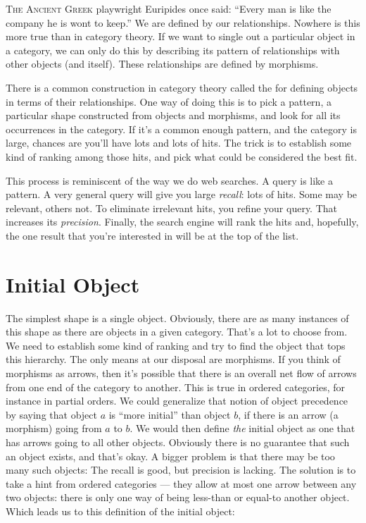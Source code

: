 \lettrine[lhang=0.17]{T}{he Ancient Greek} playwright Euripides once said: ``Every man is like
the company he is wont to keep.'' We are defined by our relationships.
Nowhere is this more true than in category theory. If we want to single
out a particular object in a category, we can only do this by describing
its pattern of relationships with other objects (and itself). These
relationships are defined by morphisms.

There is a common construction in category theory called the
 for defining objects in terms of their
relationships. One way of doing this is to pick a pattern, a particular
shape constructed from objects and morphisms, and look for all its
occurrences in the category. If it's a common enough pattern, and the
category is large, chances are you'll have lots and lots of hits. The
trick is to establish some kind of ranking among those hits, and pick
what could be considered the best fit.

This process is reminiscent of the way we do web searches. A query is
like a pattern. A very general query will give you large \emph{recall}:
lots of hits. Some may be relevant, others not. To eliminate irrelevant
hits, you refine your query. That increases its \emph{precision}.
Finally, the search engine will rank the hits and, hopefully, the one
result that you're interested in will be at the top of the list.

\section{Initial Object}

The simplest shape is a single object. Obviously, there are as many
instances of this shape as there are objects in a given category. That's
a lot to choose from. We need to establish some kind of ranking and try
to find the object that tops this hierarchy. The only means at our
disposal are morphisms. If you think of morphisms as arrows, then it's
possible that there is an overall net flow of arrows from one end of the
category to another. This is true in ordered categories, for instance in
partial orders. We could generalize that notion of object precedence by
saying that object $a$ is ``more initial'' than object $b$, if
there is an arrow (a morphism) going from $a$ to $b$. We would
then define \emph{the} initial object as one that has arrows going to
all other objects. Obviously there is no guarantee that such an object
exists, and that's okay. A bigger problem is that there may be too many
such objects: The recall is good, but precision is lacking. The solution
is to take a hint from ordered categories --- they allow at most one
arrow between any two objects: there is only one way of being less-than
or equal-to another object. Which leads us to this definition of the
initial object:

